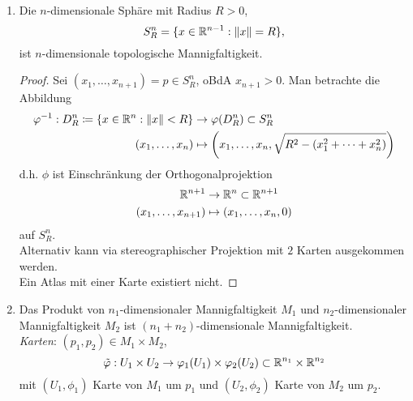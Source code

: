 \begin{example}
\begin{enumerate}
    \item Die $ n $-dimensionale Sphäre mit Radius $ R > 0 $,
    \begin{equation*}
      S^n_R = \{ x \in \mathbb{R}^{n-1} : \Vert x \Vert = R \}\text{,}
    \end{equation*}
    ist $ n $-dimensionale topologische Mannigfaltigkeit.
    \begin{proof}
      Sei $ (x_1, \dots, x_{n+1}) = p \in S^n_R $, oBdA $ x_{n+1} > 0 $. Man betrachte die Abbildung
      \begin{align*}
        \varphi^{-1} : D^n_R \coloneqq \left\{ x \in \mathbb{R}^n : \Vert x \Vert < R \right\} &\to \varphi(D^n_R) \subset S^n_R \\
          (x_1, \dots, x_n) &\mapsto \left(x_1, \dots, x_n, \sqrt{R^2-(x_1^2 + \cdots + x_n^2)}\right)
      \end{align*}
      d.h. $ \phi $ ist Einschränkung der Orthogonalprojektion
      \begin{align*}
        \mathbb{R}^{n+1} &\to \mathbb{R}^n \subset \mathbb{R}^{n+1} \\
          (x_1, \dots, x_{n+1}) &\mapsto (x_1, \dots, x_n, 0)
      \end{align*}
      auf $ S_R^n $. \\
      Alternativ kann via stereographischer Projektion mit $ 2 $ Karten ausgekommen werden. \\
      Ein Atlas mit einer Karte existiert nicht.
    \end{proof}
    \item Das Produkt von $ n_1 $-dimensionaler Mannigfaltigkeit $ M_1 $ und $ n_2 $-dimensionaler Mannigfaltigkeit $ M_2 $ ist $ (n_1+n_2) $-dimensionale Mannigfaltigkeit. \\
    \emph{Karten}: $ (p_1, p_2) \in M_1 \times M_2 $,
    \begin{equation*}
      \tilde{\varphi} : U_1 \times U_2 \to \varphi_1(U_1) \times \varphi_2(U_2) \subset \mathbb{R}^{n_1} \times \mathbb{R}^{n_2}
    \end{equation*}
    mit $ (U_1, \phi_1) $ Karte von $ M_1 $ um $ p_1 $ und $ (U_2, \phi_2) $ Karte von $ M_2 $ um $ p_2 $.
  \end{enumerate}
\end{example}

